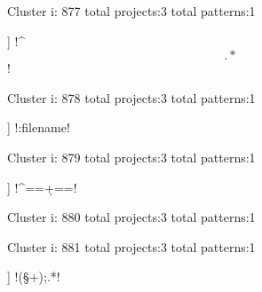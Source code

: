 Cluster i: 877
total projects:3
total patterns:1
\begin{multicols}{1}
\begin{description}[noitemsep,topsep=0pt]
\item [[3] ] \cverb!^\[.*\]!
\end{description}
\end{multicols}







Cluster i: 878
total projects:3
total patterns:1
\begin{multicols}{1}
\begin{description}[noitemsep,topsep=0pt]
\item [[3] ] \cverb!:filename!
\end{description}
\end{multicols}







Cluster i: 879
total projects:3
total patterns:1
\begin{multicols}{1}
\begin{description}[noitemsep,topsep=0pt]
\item [[3] ] \cverb!^==\d+==!
\end{description}
\end{multicols}







Cluster i: 880
total projects:3
total patterns:1
\begin{multicols}{1}
\end{multicols}







Cluster i: 881
total projects:3
total patterns:1
\begin{multicols}{1}
\begin{description}[noitemsep,topsep=0pt]
\item [[3] ] \cverb!(\S+);.*!
\end{description}
\end{multicols}







